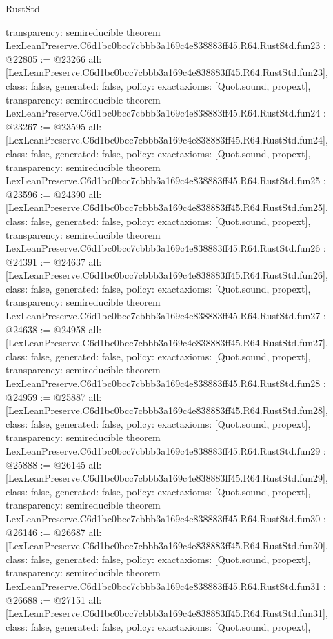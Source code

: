 \begin{lexlean}{RustStd}
\begin{coremodule}
{  transparency: semireducible
}
theorem LexLeanPreserve.C6d1bc0bcc7cbbb3a169c4e838883ff45.R64.RustStd.fun23 : @22805 := @23266 {
  all: [LexLeanPreserve.C6d1bc0bcc7cbbb3a169c4e838883ff45.R64.RustStd.fun23],
  class: false,
  generated: false,
  policy: exact{axioms: [Quot.sound, propext]},
  transparency: semireducible
}
theorem LexLeanPreserve.C6d1bc0bcc7cbbb3a169c4e838883ff45.R64.RustStd.fun24 : @23267 := @23595 {
  all: [LexLeanPreserve.C6d1bc0bcc7cbbb3a169c4e838883ff45.R64.RustStd.fun24],
  class: false,
  generated: false,
  policy: exact{axioms: [Quot.sound, propext]},
  transparency: semireducible
}
theorem LexLeanPreserve.C6d1bc0bcc7cbbb3a169c4e838883ff45.R64.RustStd.fun25 : @23596 := @24390 {
  all: [LexLeanPreserve.C6d1bc0bcc7cbbb3a169c4e838883ff45.R64.RustStd.fun25],
  class: false,
  generated: false,
  policy: exact{axioms: [Quot.sound, propext]},
  transparency: semireducible
}
theorem LexLeanPreserve.C6d1bc0bcc7cbbb3a169c4e838883ff45.R64.RustStd.fun26 : @24391 := @24637 {
  all: [LexLeanPreserve.C6d1bc0bcc7cbbb3a169c4e838883ff45.R64.RustStd.fun26],
  class: false,
  generated: false,
  policy: exact{axioms: [Quot.sound, propext]},
  transparency: semireducible
}
theorem LexLeanPreserve.C6d1bc0bcc7cbbb3a169c4e838883ff45.R64.RustStd.fun27 : @24638 := @24958 {
  all: [LexLeanPreserve.C6d1bc0bcc7cbbb3a169c4e838883ff45.R64.RustStd.fun27],
  class: false,
  generated: false,
  policy: exact{axioms: [Quot.sound, propext]},
  transparency: semireducible
}
theorem LexLeanPreserve.C6d1bc0bcc7cbbb3a169c4e838883ff45.R64.RustStd.fun28 : @24959 := @25887 {
  all: [LexLeanPreserve.C6d1bc0bcc7cbbb3a169c4e838883ff45.R64.RustStd.fun28],
  class: false,
  generated: false,
  policy: exact{axioms: [Quot.sound, propext]},
  transparency: semireducible
}
theorem LexLeanPreserve.C6d1bc0bcc7cbbb3a169c4e838883ff45.R64.RustStd.fun29 : @25888 := @26145 {
  all: [LexLeanPreserve.C6d1bc0bcc7cbbb3a169c4e838883ff45.R64.RustStd.fun29],
  class: false,
  generated: false,
  policy: exact{axioms: [Quot.sound, propext]},
  transparency: semireducible
}
theorem LexLeanPreserve.C6d1bc0bcc7cbbb3a169c4e838883ff45.R64.RustStd.fun30 : @26146 := @26687 {
  all: [LexLeanPreserve.C6d1bc0bcc7cbbb3a169c4e838883ff45.R64.RustStd.fun30],
  class: false,
  generated: false,
  policy: exact{axioms: [Quot.sound, propext]},
  transparency: semireducible
}
theorem LexLeanPreserve.C6d1bc0bcc7cbbb3a169c4e838883ff45.R64.RustStd.fun31 : @26688 := @27151 {
  all: [LexLeanPreserve.C6d1bc0bcc7cbbb3a169c4e838883ff45.R64.RustStd.fun31],
  class: false,
  generated: false,
  policy: exact{axioms: [Quot.sound, propext]},
}
\end{coremodule}
\end{lexlean}
